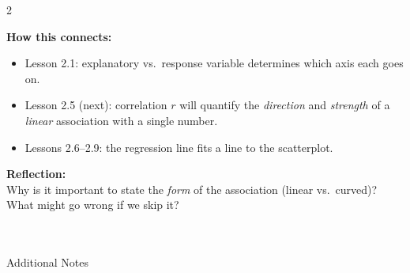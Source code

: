 \documentclass[10pt]{article}
\begin{document}
\begin{spiralbox}
\small
\begin{multicols}{2}

\textbf{How this connects:}
\begin{itemize}[itemsep=3pt]
  \item Lesson 2.1: explanatory vs.\ response variable determines which axis each goes on.
  \item Lesson 2.5 (next): correlation $r$ will quantify the \emph{direction} and \emph{strength}
        of a \textit{linear} association with a single number.
  \item Lessons 2.6--2.9: the regression line fits a line to the scatterplot.
\end{itemize}

\columnbreak

\textbf{Reflection:}\\
Why is it important to state the \emph{form} of the association (linear vs.\ curved)?
What might go wrong if we skip it?\\[2pt]
\\[1pt]
\\[1pt]
\writeline

\end{multicols}
\end{spiralbox}

\vspace{0.1in}

\begin{notesbox}{Additional Notes}
\vspace{0pt}
\writeline\\\writeline\\\writeline\\\writeline\\\writeline\\\writeline
\end{notesbox}
\end{document}
